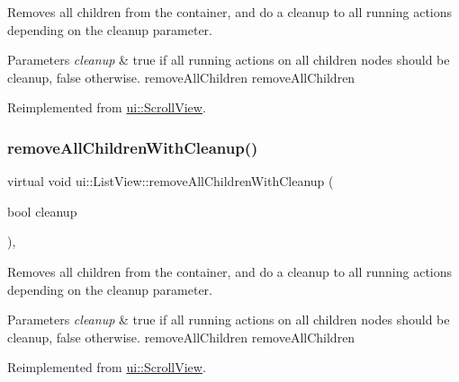 Removes all children from the container, and do a cleanup to all running actions depending on the cleanup parameter.


\begin{DoxyParams}{Parameters}
{\em cleanup} & true if all running actions on all children nodes should be cleanup, false otherwise.  remove\+All\+Children  remove\+All\+Children \\
\hline
\end{DoxyParams}


Reimplemented from \hyperlink{classui_1_1ScrollView_ac71d0fe89be6291abbccf6a6f8f011b4}{ui\+::\+Scroll\+View}.

\mbox{\label{classui_1_1ListView_a04bcc9bd8c55dea8f034a8380b3ab3a8}} 
\subsubsection{\texorpdfstring{remove\+All\+Children\+With\+Cleanup()}{removeAllChildrenWithCleanup()}\hspace{0.1cm}{\footnotesize\ttfamily [2/2]}}
{\footnotesize\ttfamily virtual void ui\+::\+List\+View\+::remove\+All\+Children\+With\+Cleanup (\begin{DoxyParamCaption}\item[{bool}]{cleanup }\end{DoxyParamCaption})\hspace{0.3cm}{\ttfamily [override]}, {\ttfamily [virtual]}}

Removes all children from the container, and do a cleanup to all running actions depending on the cleanup parameter.


\begin{DoxyParams}{Parameters}
{\em cleanup} & true if all running actions on all children nodes should be cleanup, false otherwise.  remove\+All\+Children  remove\+All\+Children \\
\hline
\end{DoxyParams}


Reimplemented from \hyperlink{classui_1_1ScrollView_ac71d0fe89be6291abbccf6a6f8f011b4}{ui\+::\+Scroll\+View}.

\mbox{\label{classui_1_1ListView_a7002fe4ad783aeccf56cebbe4144036e}} 
